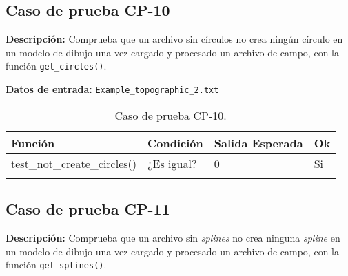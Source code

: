 \subsection{Caso de prueba CP-10}

\textbf{Descripción:} Comprueba que un archivo sin círculos no crea ningún círculo en un modelo de dibujo una vez cargado y procesado un archivo de campo, con la función \texttt{get\_circles()}.

\textbf{Datos de entrada:} \texttt{Example\_topographic\_2.txt}


\begin{longtable}[]{@{}llll@{}}
\toprule
\begin{minipage}[b]{0.6\columnwidth}\raggedright\strut
Función\strut
\end{minipage} & \begin{minipage}[b]{0.20\columnwidth}\raggedright\strut
Condición\strut
\end{minipage} & \begin{minipage}[b]{0.15\columnwidth}\raggedright\strut
Salida Esperada\strut
\end{minipage} & \begin{minipage}[b]{0.05\columnwidth}\raggedright\strut
Ok\strut
\end{minipage}\tabularnewline
\midrule
\endhead
\begin{minipage}[t]{0.6\columnwidth}\raggedright\strut
test\_not\_create\_circles()\strut
\end{minipage} & \begin{minipage}[t]{0.20\columnwidth}\raggedright\strut
¿Es igual?\strut
\end{minipage} & \begin{minipage}[t]{0.15\columnwidth}\raggedright\strut
0\strut
\end{minipage} & \begin{minipage}[t]{0.05\columnwidth}\raggedright\strut
Si\strut
\end{minipage}\tabularnewline

\bottomrule
\caption{Caso de prueba CP-10.}
\end{longtable}

\subsection{Caso de prueba CP-11}

\textbf{Descripción:} Comprueba que un archivo sin \emph{splines} no crea ninguna \emph{spline} en un modelo de dibujo una vez cargado y procesado un archivo de campo, con la función \texttt{get\_splines()}.

